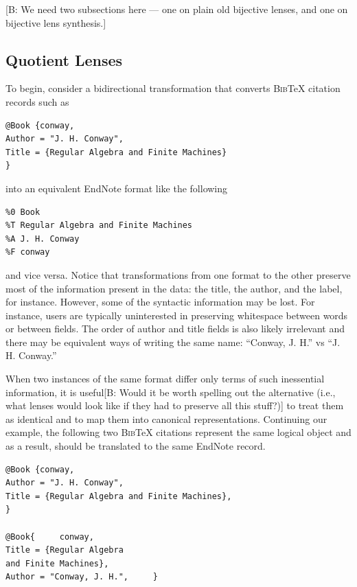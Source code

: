 \documentclass[acmsmall,review,anonymous]{acmart}
\newcommand{\FINISH}[3]{\ifdraft\textcolor{#1}{[#2: #3]}\fi}
\newcommand{\bcp}[1]{\FINISH{dkred}{B}{#1}}
\newcommand{\bibtex}{\textsc{Bib}\TeX{}}
\begin{document}
\bcp{We need two subsections here --- one on plain old bijective lenses, and
one on bijective lens synthesis.}

\subsection{Quotient Lenses}

To begin, consider a bidirectional transformation that converts
\bibtex{} citation records such as
\begin{verbatim}
@Book {conway,
Author = "J. H. Conway",
Title = {Regular Algebra and Finite Machines}
}
\end{verbatim}
\noindent
into an equivalent EndNote format like the following
\begin{verbatim}
%0 Book
%T Regular Algebra and Finite Machines
%A J. H. Conway
%F conway
\end{verbatim}
\noindent
and vice versa.
%
Notice that transformations from one format to the other preserve
most of the information present in the data:  the title, the author,
and the label, for instance.  However, some of the syntactic information
may be lost.  For instance, users are typically uninterested in preserving
whitespace between words or
between fields.  The order of author and title fields is also likely
irrelevant and there may be equivalent ways of writing the same
name:  ``Conway, J. H.'' vs ``J. H. Conway.''


When two instances of the same format differ only terms of such inessential
information, it is useful\bcp{Would it be worth spelling out the alternative
(i.e., what lenses would look like if they had to preserve all this stuff?)}
to treat them as identical and to map them 
into canonical representations.
Continuing our example, the following two
\bibtex{} citations represent the same logical object and as a result, should
be translated to the same EndNote record.
\begin{verbatim}
@Book {conway,
Author = "J. H. Conway",
Title = {Regular Algebra and Finite Machines},
}

@Book{     conway,
Title = {Regular Algebra
and Finite Machines},
Author = "Conway, J. H.",     }
\end{verbatim}
\end{document}
